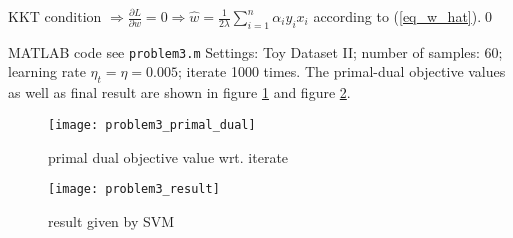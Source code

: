 \documentclass{article}
\begin{document}
\begin{myproof}[2.]
	KKT condition $\Rightarrow \frac{\partial L}{\partial w}=0\Rightarrow\hat{w} = \frac{1}{2\lambda} \sum_{i=1}^{n}\alpha_i y_i x_i$ according to (\ref{eq_w_hat}).\qed
\end{myproof}
\newpage
\begin{myproof}[3.]
	MATLAB code see \verb|problem3.m|
	\newline
	Settings: Toy Dataset II; number of samples: 60; learning rate $\eta_t = \eta = 0.005$; iterate 1000 times. The primal-dual objective values as well as final result are shown in figure \ref{fig:problem3primaldual} and figure \ref{fig:problem3result}.
	\begin{figure}[h!]
		\centering
		\texttt{[image: problem3\_primal\_dual]}
		\caption{primal dual objective value wrt. iterate}
		\label{fig:problem3primaldual}
	\end{figure}
	\begin{figure}[h!]
		\centering
		\texttt{[image: problem3\_result]}
		\caption{result given by SVM}
		\label{fig:problem3result}
	\end{figure}
	
\end{myproof}
\end{document}

